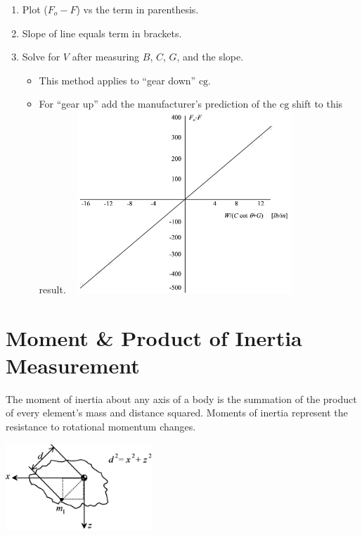 \documentclass[
]{book}
\providecommand{\tightlist}{%
  \setlength{\itemsep}{0pt}\setlength{\parskip}{0pt}}
\begin{document}
\begin{enumerate}
\def\labelenumi{\arabic{enumi}.}
\setcounter{enumi}{3}
\tightlist
\item
  Plot (\(F_o-F\)) vs the term in parenthesis.
\item
  Slope of line equals term in brackets.
\item
  Solve for \(V\) after measuring \(B\), \(C\), \(G\), and the slope.

  \begin{itemize}
  \tightlist
  \item
    This method applies to ``gear down'' \(\mathrm{cg}\).
  \item
    For ``gear up'' add the manufacturer's prediction of the \(\mathrm{cg}\) shift to this result.
    ~
    \includegraphics[width=3.17083in,height=2.69792in]{media/07/image9.svg}
  \end{itemize}
\end{enumerate}

\hypertarget{moment-product-of-inertia-measurement}{%
\section{Moment \& Product of Inertia Measurement~}\label{moment-product-of-inertia-measurement}}

The moment of inertia about any axis of a body is the summation of the product of every element's mass and distance squared. Moments of inertia represent the resistance to rotational momentum changes.

\includegraphics[width=2.16458in,height=1.28264in]{media/07/image13.svg}
\end{document}
